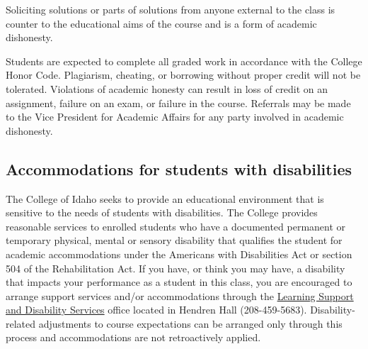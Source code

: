 \documentclass[symmetric]{tufte-handout}
\begin{document}
Soliciting solutions or parts of solutions from anyone external to the class is counter
to the educational aims of the course and is a form of academic dishonesty.

Students are expected to complete all graded work in accordance with the
College Honor Code. Plagiarism, cheating, or borrowing without proper credit
will not be tolerated.  Violations of academic honesty can result in loss of
credit on an assignment, failure on an exam, or failure in the course.
Referrals may be made to the Vice President for Academic Affairs for any party
involved in academic dishonesty.

\subsection{Accommodations for students with disabilities}

The College of Idaho seeks to provide an educational environment that is
sensitive to the needs of students with disabilities. The College provides
reasonable services to enrolled students who have a documented permanent or
temporary physical, mental or sensory disability that qualifies the student
for academic accommodations under the Americans with Disabilities Act or
section 504 of the Rehabilitation Act. If you have, or think you may have, a
disability that impacts your performance as a student in this class, you are
encouraged to arrange support services and/or accommodations through the
\href{http://www.collegeofidaho.edu/campus-life/learning-and-support-services
/learning-support-disability-services}{Learning Support and Disability
Services} office located in Hendren Hall (208-459-5683). Disability-related
adjustments to course expectations can be arranged only through this process
and accommodations are not retroactively applied.


\begin{fullwidth}
\end{fullwidth}

\end{document}
